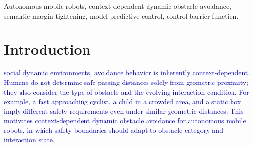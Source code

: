 \documentclass[journal]{IEEEtranTIE}
\begin{document}
\begin{IEEEkeywords}
Autonomous mobile robots, context-dependent dynamic obstacle avoidance, semantic margin tightening, model predictive control, control barrier function.
\end{IEEEkeywords}
    



    \section{Introduction}

     \textcolor{blue}{social dynamic environments, avoidance behavior is inherently context-dependent. Humans do not determine safe passing distances solely from geometric proximity; they also consider the type of obstacle and the evolving interaction condition. For example, a fast approaching cyclist, a child in a crowded area, and a static box imply different safety requirements even under similar geometric distances. This motivates context-dependent dynamic obstacle avoidance for autonomous mobile robots, in which safety boundaries should adapt to obstacle category and interaction state.}
\end{document}
